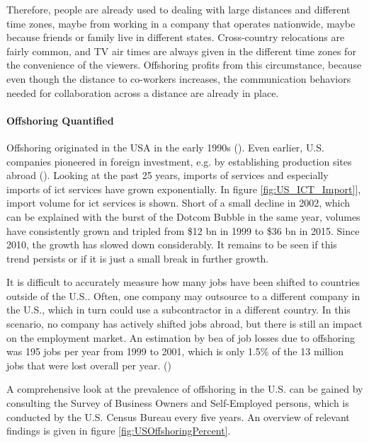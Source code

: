Therefore, people are already used to dealing with large distances and different time zones, maybe from working in a company that operates nationwide, maybe because friends or family live in different states. Cross-country relocations are fairly common, and TV air times are always given in the different time zones for the convenience of the viewers. Offshoring profits from this circumstance, because even though the distance to co-workers increases, the communication behaviors needed for collaboration across a distance are already in place.


\paragraph{Offshoring Quantified}
Offshoring originated in the USA in the early 1990s (\cite[p. 389]{Pisani.2016}). Even earlier, U.S. companies pioneered in foreign investment, e.g. by establishing production sites abroad (\cite[p. 5]{Kozlow.2006}). Looking at the past 25 years, imports of services and especially imports of \gls{ict} services have grown exponentially. In figure \ref{fig:US_ICT_Import}], import volume for \gls{ict} services is shown. Short of a small decline in 2002, which can be explained with the burst of the Dotcom Bubble in the same year, volumes have consistently grown and tripled from \$12 bn in 1999 to \$36 bn in 2015. Since 2010, the growth has slowed down considerably. It remains to be seen if this trend persists or if it is just a small break in further growth.


It is difficult to accurately measure how many jobs have been shifted to countries outside of the U.S.. Often, one company may outsource to a different company in the U.S., which in turn could use a subcontractor in a different country. In this scenario, no company has actively shifted jobs abroad, but there is still an impact on the employment market. An estimation by \gls{bea} of job losses due to offshoring was 195  jobs per year from 1999 to 2001, which is only 1.5\% of the 13 million jobs that were lost overall per year. (\cite[pp. 14ff]{Kozlow.2006})

A comprehensive look at the prevalence of offshoring in the U.S. can be gained by consulting the Survey of Business Owners and Self-Employed persons, which is conducted by the U.S. Census Bureau every five years. An overview of relevant findings is given in figure \ref{fig:USOffshoringPercent}.


